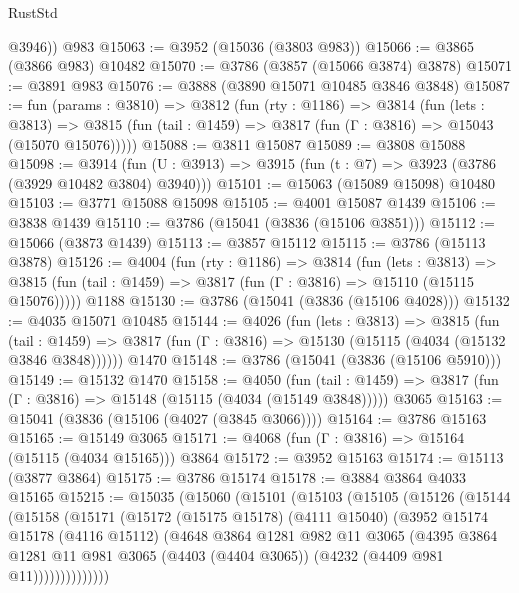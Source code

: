 \begin{lexlean}{RustStd}
\begin{coremodule}
        @3946))
    @983
@15063 := @3952 (@15036 (@3803 @983))
@15066 := @3865 (@3866 @983) @10482
@15070 := @3786 (@3857 (@15066 @3874) @3878)
@15071 := @3891 @983
@15076 := @3888 (@3890 @15071 @10485 @3846 @3848)
@15087 := fun (params : @3810) =>
  @3812
    (fun (rty : @1186) =>
    @3814
      (fun (lets : @3813) =>
      @3815 (fun (tail : @1459) => @3817 (fun (Γ : @3816) => @15043 (@15070 @15076)))))
@15088 := @3811 @15087
@15089 := @3808 @15088
@15098 := @3914
    (fun (U : @3913) => @3915 (fun (t : @7) => @3923 (@3786 (@3929 @10482 @3804) @3940)))
@15101 := @15063 (@15089 @15098) @10480
@15103 := @3771 @15088 @15098
@15105 := @4001 @15087 @1439
@15106 := @3838 @1439
@15110 := @3786 (@15041 (@3836 (@15106 @3851)))
@15112 := @15066 (@3873 @1439)
@15113 := @3857 @15112
@15115 := @3786 (@15113 @3878)
@15126 := @4004
    (fun (rty : @1186) =>
    @3814
      (fun (lets : @3813) =>
      @3815 (fun (tail : @1459) => @3817 (fun (Γ : @3816) => @15110 (@15115 @15076)))))
    @1188
@15130 := @3786 (@15041 (@3836 (@15106 @4028)))
@15132 := @4035 @15071 @10485
@15144 := @4026
    (fun (lets : @3813) =>
    @3815
      (fun (tail : @1459) =>
      @3817 (fun (Γ : @3816) => @15130 (@15115 (@4034 (@15132 @3846 @3848))))))
    @1470
@15148 := @3786 (@15041 (@3836 (@15106 @5910)))
@15149 := @15132 @1470
@15158 := @4050
    (fun (tail : @1459) => @3817 (fun (Γ : @3816) => @15148 (@15115 (@4034 (@15149 @3848)))))
    @3065
@15163 := @15041 (@3836 (@15106 (@4027 (@3845 @3066))))
@15164 := @3786 @15163
@15165 := @15149 @3065
@15171 := @4068 (fun (Γ : @3816) => @15164 (@15115 (@4034 @15165))) @3864
@15172 := @3952 @15163
@15174 := @15113 (@3877 @3864)
@15175 := @3786 @15174
@15178 := @3884 @3864 @4033 @15165
@15215 := @15035
    (@15060
      (@15101
        (@15103
          (@15105
            (@15126
              (@15144
                (@15158
                  (@15171
                    (@15172
                      (@15175 @15178)
                      (@4111 @15040)
                      (@3952
                        @15174
                        @15178
                        (@4116 @15112)
                        (@4648
                          @3864
                          @1281
                          @982
                          @11
                          @3065
                          (@4395
                            @3864
                            @1281
                            @11
                            @981
                            @3065
                            (@4403 (@4404 @3065))
                            (@4232 (@4409 @981 @11))))))))))))))

\end{coremodule}
\end{lexlean}
